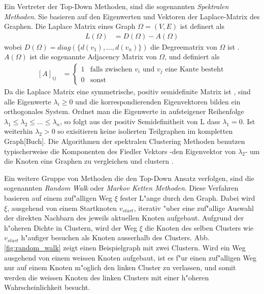 \documentclass[journal]{vgtc}
\begin{document}
  Ein Vertreter der Top-Down Methoden, sind die sogenannten \emph{Spektralen Methoden}. Sie basieren auf den
  Eigenwerten und Vektoren der Laplace-Matrix des Graphen. Die Laplace Matrix eines Graph
  $\Omega=(V,E)$ ist definert als
  \begin{align}
    L(\Omega)&=D(\Omega)-A(\Omega)
  \end{align}
  wobei $D(\Omega)=diag(\{d(v_1), ..., d(v_n)\})$ die Degreematrix von $\Omega$ ist \cite{graphcontrol}.
  $A(\Omega)$ ist die sogenannte Adjacency Matrix von $\Omega$, und definiert als
  \begin{align}
   \left[A\right]_{ij}&= \begin{cases}
			    1 & \text{falls zwischen }v_i\text{ und }v_j\text{ eine Kante besteht}\\
			    0 & \text{sonst}
			  \end{cases}
  \end{align}
  Da die Laplace Matrix eine symmetrische, positiv semidefinite Matrix ist \cite{graphcontrol}, sind alle Eigenwerte $\lambda_i \ge 0$
  und die korrespondierenden Eigenvektoren bilden ein orthogonales System. Ordnet man die Eigenwerte in
  aufsteigener Reihenfolge $\lambda_1 \le \lambda_2 \le \dots \le \lambda_n$, so folgt aus der positiv Semidefinitheit
  von L dass $\lambda_1 = 0$. Ist weiterhin $\lambda_2 > 0$ so exisitieren keine isolierten Teilgraphen im kompletten
  Graph[Buch]. Die Algorithmen der spektralen Clustering Methoden benutzen typischerweise die Komponenten des Fiedler
  Vektors -den Eigenvektor von $\lambda_2$- um die Knoten eins Graphen zu vergleichen und clustern \cite{Schaeffer}.

  Ein weitere Gruppe von Methoden die den Top-Down Ansatz verfolgen, sind die sogenannten \emph{Random Walk} oder
  \emph{Markov Ketten Methoden}. Diese Verfahren basieren auf einem zuf"alligen Weg $\xi$ fester L"ange durch den Graph.
  Dabei wird $\xi$, ausgehend von einem Startknoten $v_{start}$, iterativ "uber eine zuf"allige Auswahl
  der direkten Nachbarn des jeweils aktuellen Knoten aufgebaut. Aufgrund der h"oheren Dichte in Clustern, wird der Weg
  $\xi$ die Knoten des selben Clusters wie $v_{start}$ h"aufiger besuchen als Knoten ausserhalb des Clusters.
  Abb. \ref{fig:random_walk} zeigt einen Beispielgraph mit zwei Clustern. Wird ein Weg ausgehend von einem weissen
  Knoten aufgebaut, ist es f"ur einen zuf"alligen Weg nur auf einem Knoten m"oglich den linken Cluster zu verlassen,
  und somit werden die weissen Knoten des linken Clusters mit einer h"oheren Wahrscheinlichkeit besucht. 
\end{document}

